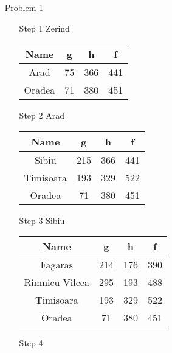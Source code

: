 \normalfont\documentclass[letterpaper,11pt]{article}
\begin{document}
\setlength{\parindent}{2ex}
\newcommand{\header}{
	\noindent {}
}
\bigskip
\header

\begin{enumerate}
\item[Problem 1]\par
	\begin{enumerate}
		\item[Step 1] Zerind\\
			\begin{tabular}{|c|c|c|c|}
				\hline
				Name & g & h & f\\
				\hline
				Arad & 75 & 366 & 441\\
				Oradea & 71 & 380 & 451\\
				\hline
			\end{tabular}
		\item[Step 2]  Arad\\
			\begin{tabular}{|c|c|c|c|}
				\hline
				Name & g & h & f\\
				\hline
				Sibiu & 215 & 366 & 441\\
				Timisoara& 193 & 329 & 522\\
				Oradea & 71 & 380 & 451\\
				\hline
			\end{tabular}
		\item[Step 3] 
			Sibiu\\
			\begin{tabular}{|c|c|c|c|}
				\hline
				Name & g & h & f\\
				\hline
				Fagaras & 214 & 176 & 390\\
				Rimnicu Vilcea &  295 & 193 & 488\\
				Timisoara & 193 &  329 & 522\\
				Oradea & 71 & 380 & 451\\
				\hline
			\end{tabular}
		\item[Step 4]

\end{enumerate}
\end{enumerate}
\end{document}
